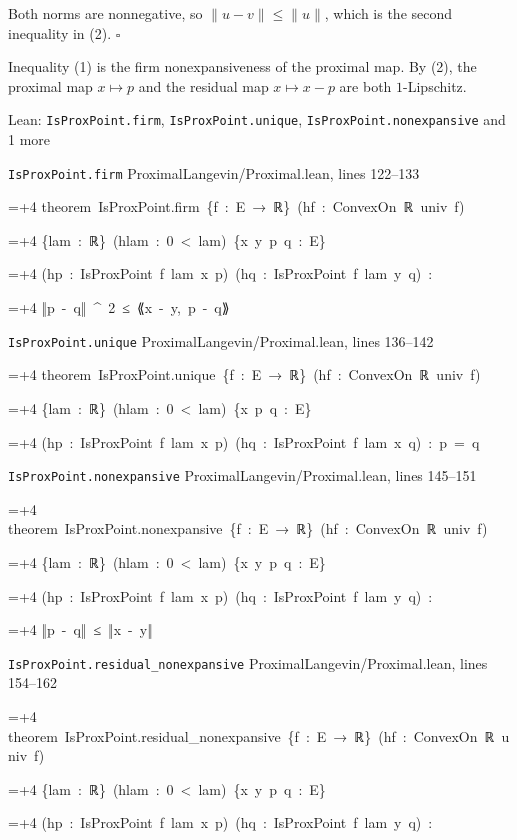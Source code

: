 \documentclass[11pt,a4paper]{article}
\newlength{\leancharwidth}
\newenvironment{leancode}{\par\smallskip\begingroup\ttfamily\footnotesize\raggedright
  \settowidth{\leancharwidth}{M}\setlength{\parskip}{0pt}\setlength{\parindent}{0pt}
  \frenchspacing}{\par\endgroup\smallskip}
\newcommand{\leanline}[2]{\hangindent=\dimexpr#1\leancharwidth+4\leancharwidth\relax
  \hangafter=1\noindent\hspace*{#1\leancharwidth}#2\par}
\newcommand{\leansource}[1]{\par{\footnotesize\color{leanmuted}#1}\par}
\begin{document}
Both norms are nonnegative, so \(\|u-v\|\le\|u\|\), which is the second inequality in (2). \(\square\)




Inequality (1) is the firm nonexpansiveness of the proximal map. By (2), the proximal map \(x\mapsto p\) and the residual map \(x\mapsto x-p\) are both \(1\)-Lipschitz.

\begin{leanbox}{Lean: \texttt{IsProxPoint.\allowbreak{}firm}, \texttt{IsProxPoint.\allowbreak{}unique}, \texttt{IsProxPoint.\allowbreak{}nonexpansive} and 1 more}
\leansource{\texttt{IsProxPoint.\allowbreak{}firm} \quad ProximalLangevin/\allowbreak{}Proximal.lean, lines 122–133}
\begin{leancode}
\leanline{0}{theorem\ IsProxPoint.firm\ \{f\ :\ E\ →\ ℝ\}\ (hf\ :\ ConvexOn\ ℝ\ univ\ f)}
\leanline{4}{\{lam\ :\ ℝ\}\ (hlam\ :\ 0\ <\ lam)\ \{x\ y\ p\ q\ :\ E\}}
\leanline{4}{(hp\ :\ IsProxPoint\ f\ lam\ x\ p)\ (hq\ :\ IsProxPoint\ f\ lam\ y\ q)\ :}
\leanline{4}{‖p\ -\ q‖\ \textasciicircum{}\ 2\ ≤\ {\leanfallback ⟪}x\ -\ y,\ p\ -\ q{\leanfallback ⟫}}
\end{leancode}
\leansource{\texttt{IsProxPoint.\allowbreak{}unique} \quad ProximalLangevin/\allowbreak{}Proximal.lean, lines 136–142}
\begin{leancode}
\leanline{0}{theorem\ IsProxPoint.unique\ \{f\ :\ E\ →\ ℝ\}\ (hf\ :\ ConvexOn\ ℝ\ univ\ f)}
\leanline{4}{\{lam\ :\ ℝ\}\ (hlam\ :\ 0\ <\ lam)\ \{x\ p\ q\ :\ E\}}
\leanline{4}{(hp\ :\ IsProxPoint\ f\ lam\ x\ p)\ (hq\ :\ IsProxPoint\ f\ lam\ x\ q)\ :\ p\ =\ q}
\end{leancode}
\leansource{\texttt{IsProxPoint.\allowbreak{}nonexpansive} \quad ProximalLangevin/\allowbreak{}Proximal.lean, lines 145–151}
\begin{leancode}
\leanline{0}{theorem\ IsProxPoint.nonexpansive\ \{f\ :\ E\ →\ ℝ\}\ (hf\ :\ ConvexOn\ ℝ\ univ\ f)}
\leanline{4}{\{lam\ :\ ℝ\}\ (hlam\ :\ 0\ <\ lam)\ \{x\ y\ p\ q\ :\ E\}}
\leanline{4}{(hp\ :\ IsProxPoint\ f\ lam\ x\ p)\ (hq\ :\ IsProxPoint\ f\ lam\ y\ q)\ :}
\leanline{4}{‖p\ -\ q‖\ ≤\ ‖x\ -\ y‖}
\end{leancode}
\leansource{\texttt{IsProxPoint.\allowbreak{}residual\_\allowbreak{}nonexpansive} \quad ProximalLangevin/\allowbreak{}Proximal.lean, lines 154–162}
\begin{leancode}
\leanline{0}{theorem\ IsProxPoint.residual\_nonexpansive\ \{f\ :\ E\ →\ ℝ\}\ (hf\ :\ ConvexOn\ ℝ\ univ\ f)}
\leanline{4}{\{lam\ :\ ℝ\}\ (hlam\ :\ 0\ <\ lam)\ \{x\ y\ p\ q\ :\ E\}}
\leanline{4}{(hp\ :\ IsProxPoint\ f\ lam\ x\ p)\ (hq\ :\ IsProxPoint\ f\ lam\ y\ q)\ :}

\end{leancode}
\end{leanbox}
\end{document}
